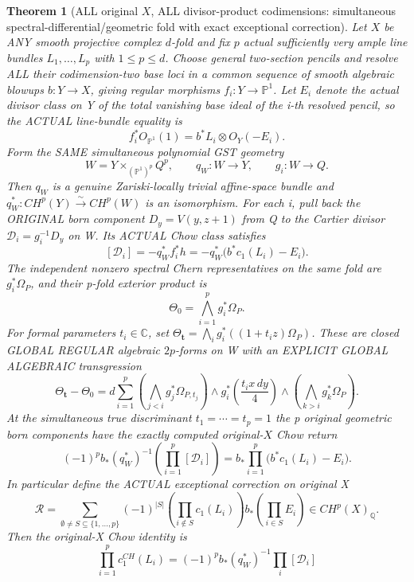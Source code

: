 \documentclass[11pt]{article}
\newtheorem{theorem}{Theorem}[section]
\begin{document}
\begin{theorem}[ALL original $X$, ALL divisor-product codimensions:
simultaneous spectral-differential/geometric fold with exact exceptional correction]
Let $X$ be ANY smooth projective
complex $d$-fold and fix
$p$ actual sufficiently very ample
line bundles $L_1,\ldots,L_p$ with
$1\le p\le d$.
Choose general two-section pencils
and resolve ALL their codimension-two
base loci in a common sequence of
smooth algebraic blowups
$b:Y\to X$, giving regular morphisms
$f_i:Y\to\mathbb P^1$.
Let $E_i$ denote the actual divisor
class on Y of the total vanishing base
ideal of the i-th resolved pencil,
so the ACTUAL line-bundle equality is
\[
 f_i^*O_{\mathbb P^1}(1)
      = b^*L_i\otimes O_Y(-E_i).
\]
Form the SAME simultaneous polynomial
GST geometry
\[
 W=Y\times_{(\mathbb P^1)^p}Q^p,
 \qquad q_W:W\to Y,
 \qquad g_i:W\to Q.
\]
Then $q_W$ is a genuine Zariski-locally
trivial affine-space bundle and
$q_W^*:CH^p(Y)\overset{\sim}\to CH^p(W)$
is an isomorphism.
For each i, pull back the ORIGINAL
born component $D_y=V(y,z+1)$
from Q to the Cartier divisor
$\mathcal D_i=g_i^{-1}D_y$ on W.
Its ACTUAL Chow class satisfies
\[
 [\mathcal D_i]
  =-q_W^*f_i^*h
  =-q_W^*\big(b^*c_1(L_i)-E_i\big).
\]
The independent nonzero spectral
Chern representatives on the same
fold are $g_i^*\Omega_P$, and their
p-fold exterior product is
\[
 \Theta_0=\bigwedge_{i=1}^p g_i^*\Omega_P.
\]
For formal parameters $t_i\in\mathbb C$,
set $\Theta_{\mathbf t}=
 \bigwedge_i g_i^*((1+t_i z)\Omega_P)$.
These are closed GLOBAL REGULAR
algebraic $2p$-forms on W with an
EXPLICIT GLOBAL ALGEBRAIC transgression
\[
 \boxed{
 \Theta_{\mathbf t}-\Theta_0
 =d\sum_{i=1}^p\left(
 \bigwedge_{j<i}g_j^*\Omega_{P,t_j}\right)
 \wedge g_i^*\left(\frac{t_i x\,dy}{4}\right)
 \wedge\left(
 \bigwedge_{k>i}g_k^*\Omega_P\right).
 }                                            \tag{48}
\]
At the simultaneous true discriminant
$t_1=\cdots=t_p=1$ the p
original geometric born components
have the exactly computed
original-$X$ Chow return
\[
 \boxed{
 (-1)^p b_*(q_W^*)^{-1}
   \left(\prod_{i=1}^p[\mathcal D_i]\right)
 =b_*\prod_{i=1}^p
          \big(b^*c_1(L_i)-E_i\big).
 }                                            \tag{49}
\]
In particular define the ACTUAL exceptional
correction on original X
\[
 \mathcal R=
 \sum_{\emptyset\ne S\subseteq\{1,\ldots,p\}}
    (-1)^{|S|}
    \left(\prod_{i\notin S}c_1(L_i)\right)
    b_*\left(\prod_{i\in S}E_i\right)
 \in CH^p(X)_{\mathbb Q}.
\]
Then the original-X Chow identity is
\[
 \boxed{
 \prod_{i=1}^p c_1^{CH}(L_i)
 =(-1)^p b_*(q_W^*)^{-1}
          \prod_i[\mathcal D_i]
}\]
\end{theorem}
\end{document}
